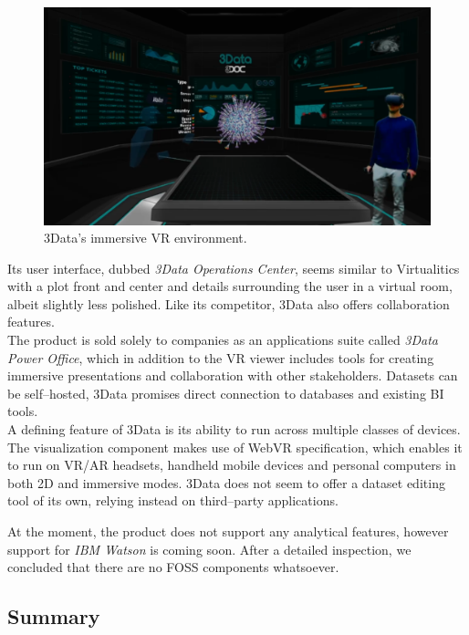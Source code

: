 \documentclass{article}
\begin{document}
\begin{figure}[!h]
\centering
\includegraphics[scale=0.18]{images/3data}
\caption{3Data's immersive VR environment.\cite{3datavideo}}
\label{fig:3data}
\end{figure}

Its user interface, dubbed \emph{3Data Operations Center}, seems similar to Virtualitics with a plot front and center and details surrounding the user in a virtual room, albeit slightly less polished. Like its competitor, 3Data also offers collaboration features.\\

The product is sold solely to companies as an applications suite called \emph{3Data Power Office}, which in addition to the VR viewer includes tools for creating immersive presentations and collaboration with other stakeholders. Datasets can be self--hosted, 3Data promises direct connection to databases and existing BI tools.\cite{3datasuite}\\

A defining feature of 3Data is its ability to run across multiple classes of devices. The visualization component makes use of WebVR specification, which enables it to run on VR/AR headsets, handheld mobile devices and personal computers in both 2D and immersive modes.\cite{webvr} 3Data does not seem to offer a dataset editing tool of its own, relying instead on third--party applications.\\

\newpage

At the moment, the product does not support any analytical features, however support for \emph{IBM Watson} is coming soon. After a detailed inspection, we concluded that there are no FOSS components whatsoever.

\subsection{Summary}
\end{document}
